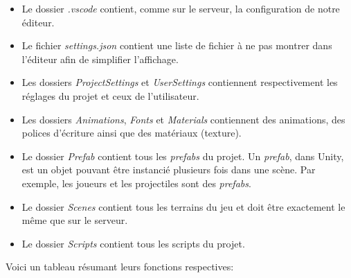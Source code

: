 \documentclass[a4paper]{article}
\begin{document}
\begin{itemize}
\item Le dossier \emph{.vscode} contient, comme sur le serveur, la configuration de notre éditeur.
\item Le fichier \emph{settings.json} contient  une liste de fichier à ne pas montrer dans l’éditeur afin de simplifier l’affichage.
\item Les dossiers \emph{ProjectSettings} et \emph{UserSettings} contiennent respectivement les réglages du projet et ceux de l’utilisateur.
\item Les dossiers \emph{Animations}, \emph{Fonts} et \emph{Materials} contiennent des animations, des polices d’écriture ainsi que des matériaux (texture). 
\item Le dossier \emph{Prefab} contient tous les \textit{prefabs} du projet. Un \textit{prefab}, dans Unity, est un objet pouvant être instancié plusieurs fois dans une scène. Par exemple, les joueurs et les projectiles sont des \textit{prefabs}.
\item Le dossier \emph{Scenes} contient tous les terrains du jeu et doit être exactement le même que sur le serveur.
\item Le dossier \emph{Scripts} contient tous les scripts du projet.
\end{itemize}
Voici un tableau résumant leurs fonctions respectives:
\end{document}
